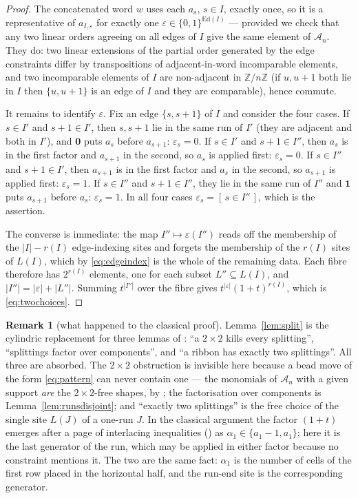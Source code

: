 \documentclass[11pt]{article}
\theoremstyle{plain}
\theoremstyle{definition}
\newtheorem{remark}[theorem]{Remark}
\newcommand{\A}{\mathscr{A}}
\newcommand{\ZZ}{\mathbb{Z}}
\begin{document}
\begin{proof}
The concatenated word $w$ uses each $a_s$, $s\in I$, exactly once, so it is a
representative of $a_{I,\varepsilon}$ for exactly one
$\varepsilon\in\{0,1\}^{\mathrm{Ed}(I)}$ --- provided we check that any two
linear orders agreeing on all edges of $I$ give the same element of $\A_n$.
They do: two linear extensions of the partial order generated by the edge
constraints differ by transpositions of adjacent-in-word incomparable elements,
and two incomparable elements of $I$ are non-adjacent in $\ZZ/n\ZZ$ (if $u,u+1$
both lie in $I$ then $\{u,u+1\}$ is an edge of $I$ and they are comparable),
hence commute.

It remains to identify $\varepsilon$.  Fix an edge $\{s,s+1\}$ of $I$ and
consider the four cases.  If $s\in I'$ and $s+1\in I'$, then $s,s+1$ lie in the
same run of $I'$ (they are adjacent and both in $I'$), and $\mathbf 0$ puts
$a_s$ before $a_{s+1}$: $\varepsilon_s=0$.  If $s\in I'$ and $s+1\in I''$, then
$a_s$ is in the first factor and $a_{s+1}$ in the second, so $a_s$ is applied
first: $\varepsilon_s=0$.  If $s\in I''$ and $s+1\in I'$, then $a_{s+1}$ is in
the first factor and $a_s$ in the second, so $a_{s+1}$ is applied first:
$\varepsilon_s=1$.  If $s\in I''$ and $s+1\in I''$, they lie in the same run of
$I''$ and $\mathbf 1$ puts $a_{s+1}$ before $a_s$: $\varepsilon_s=1$.  In all
four cases $\varepsilon_s=[\,s\in I''\,]$, which is the assertion.

The converse is immediate: the map $I''\mapsto\varepsilon(I'')$ reads off the
membership of the $|I|-r(I)$ edge-indexing sites and forgets the membership of
the $r(I)$ sites of $L(I)$, which by \eqref{eq:edgeindex} is the whole of the
remaining data.  Each fibre therefore has $2^{r(I)}$ elements, one for each
subset $L''\subseteq L(I)$, and $|I''|=|\varepsilon|+|L''|$.  Summing
$t^{|I''|}$ over the fibre gives $t^{|\varepsilon|}(1+t)^{r(I)}$, which is
\eqref{eq:twochoices}.
\end{proof}

\begin{remark}[what happened to the classical proof]\label{rem:classical}
Lemma~\ref{lem:split} is the cylindric replacement for three lemmas of
\cite{Clio75}: ``a $2\times2$ kills every splitting'', ``splittings factor over
components'', and ``a ribbon has exactly two splittings''.  All three are
absorbed.  The $2\times2$ obstruction is invisible here because a bead move of
the form \eqref{eq:pattern} can never contain one --- the monomials of $\A_n$
with a given support \emph{are} the $2\times2$-free shapes, by
\cite[\texttt{thm:A}]{Clio201}; the factorisation over components is
Lemma~\ref{lem:runsdisjoint}; and ``exactly two splittings'' is the free choice
of the single site $L(J)$ of a one-run $J$.  In the classical argument the
factor $(1+t)$ emerges after a page of interlacing inequalities
(\cite[\texttt{lem:ribbon}]{Clio75}) as $\alpha_1\in\{a_1-1,a_1\}$; here it is the last
generator of the run, which may be applied in either factor because no
constraint mentions it.  The two are the same fact: $\alpha_1$ is the number of
cells of the first row placed in the horizontal half, and the run-end site is
the corresponding generator.
\end{remark}
\end{document}
